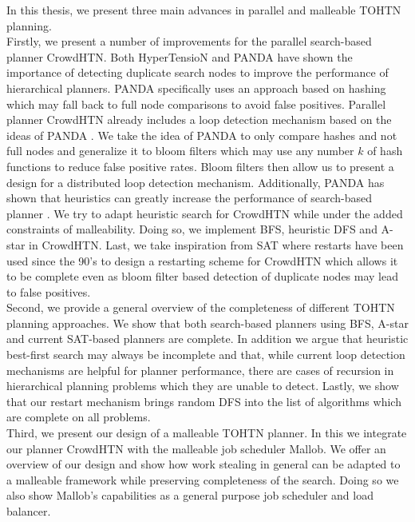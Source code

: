 \documentclass[enabledeprecatedfontcommands,12pt,a4paper,twoside]{scrartcl}
\numberwithin{equation}{section}
\begin{document}
In this thesis, we present three main advances in parallel and malleable TOHTN planning. \\
Firstly, we present a number of improvements for the parallel search-based planner CrowdHTN.
Both HyperTensioN \cite{magnaguagno2020hypertension} and PANDA \cite{holler2021loop} have shown the importance of detecting duplicate search nodes to improve the performance of hierarchical planners. PANDA specifically uses an approach based on hashing which may fall back to full node comparisons to avoid false positives. Parallel planner CrowdHTN already includes a loop detection mechanism based on the ideas of PANDA \cite{bretl2021parallel}. We take the idea of PANDA to only compare hashes and not full nodes and generalize it to bloom filters which may use any number $k$ of hash functions to reduce false positive rates. Bloom filters then allow us to present a design for a distributed loop detection mechanism. Additionally, PANDA has shown that heuristics can greatly increase the performance of search-based planner \cite{holler2020htn}. We try to adapt heuristic search for CrowdHTN while under the added constraints of malleability. Doing so, we implement BFS, heuristic DFS and A-star in CrowdHTN.
Last, we take inspiration from SAT where restarts have been used since the 90's \cite{crawford1994experimental} to design a restarting scheme for CrowdHTN which allows it to be complete even as bloom filter based detection of duplicate nodes may lead to false positives. \\
Second, we provide a general overview of the completeness of different TOHTN planning approaches. We show that both search-based planners using BFS, A-star and current SAT-based planners are complete. In addition we argue that heuristic best-first search may always be incomplete and that, while current loop detection mechanisms are helpful for planner performance, there are cases of recursion in hierarchical planning problems which they are unable to detect. Lastly, we show that our restart mechanism brings random DFS into the list of algorithms which are complete on all problems. \\
Third, we present our design of a malleable TOHTN planner. In this we integrate our planner CrowdHTN with the malleable job scheduler Mallob. We offer an overview of our design and show how work stealing in general can be adapted to a malleable framework while preserving completeness of the search. Doing so we also show Mallob's capabilities as a general purpose job scheduler and load balancer.\\
\end{document}
